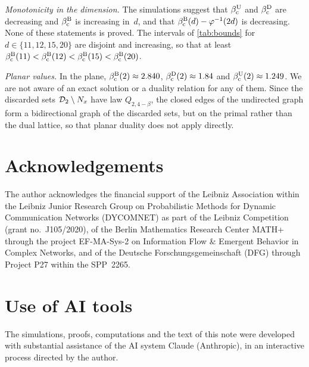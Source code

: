 \documentclass[11pt,letterpaper]{article}
\begin{document}
\emph{Monotonicity in the dimension.} The simulations suggest that $\beta_{\mathrm c}^{\mathrm U}$ and $\beta_{\mathrm c}^{\mathrm D}$ are decreasing and $\beta_{\mathrm c}^{\mathrm B}$ is increasing in~$d$, and that $\beta_{\mathrm c}^{\mathrm B}(d)-\varphi^{-1}(2d)$ is decreasing. None of these statements is proved. The intervals of \cref{tab:bounds} for $d\in\{11,12,15,20\}$ are disjoint and increasing, so that at least $\beta_{\mathrm c}^{\mathrm B}(11)<\beta_{\mathrm c}^{\mathrm B}(12)<\beta_{\mathrm c}^{\mathrm B}(15)<\beta_{\mathrm c}^{\mathrm B}(20)$.

\emph{Planar values.} In the plane, $\beta_{\mathrm c}^{\mathrm B}(2)\approx2.840$, $\beta_{\mathrm c}^{\mathrm D}(2)\approx1.84$ and $\beta_{\mathrm c}^{\mathrm U}(2)\approx1.249$. We are not aware of an exact solution or a duality relation for any of them. Since the discarded sets $\mathcal D_2\setminus N_x$ have law $Q_{2,4-\beta}$, the closed edges of the undirected graph form a bidirectional graph of the discarded sets, but on the primal rather than the dual lattice, so that planar duality does not apply directly.


\section*{Acknowledgements}
The author acknowledges the financial support of the Leibniz Association within the Leibniz Junior Research Group on Probabilistic Methods for Dynamic Communication Networks (DYCOMNET) as part of the Leibniz Competition (grant no.\ J105/2020), of the Berlin Mathematics Research Center MATH+ through the project EF-MA-Sys-2 on Information Flow \& Emergent Behavior in Complex Networks, and of the Deutsche Forschungsgemeinschaft (DFG) through Project P27 within the SPP~2265.

\section*{Use of AI tools}
The simulations, proofs, computations and the text of this note were developed with substantial assistance of the AI system Claude (Anthropic), in an interactive process directed by the author.
\end{document}
